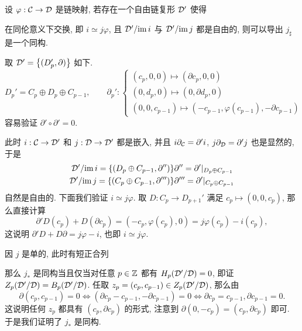 \begin{Proof}
	设 $ \varphi : \mathcal{C}\to\mathcal{D} $ 是链映射, 若存在一个自由链复形 $ \mathcal{D}' $ 使得
	\begin{center}
	\end{center}
	在同伦意义下交换, 即 $ i\simeq j\varphi $, 且 $ \mathcal{D}'/\mathrm{im}\, i $ 与 $ \mathcal{D}'/\mathrm{im}\, j $ 都是自由的, 则可以导出 $ j_\sharp $ 是一个同构.

	取 $ \mathcal{D}'=\left\{ (D_p',\partial) \right\} $ 如下.
	\[
		D_p'=C_p\oplus D_p\oplus C_{p-1},\qquad \partial_p' : \begin{cases}
			(c_p,0,0)\mapsto(\partial c_p,0,0)\\ (0,d_p,0)\mapsto(0,\partial d_p,0)\\ (0,0,c_{p-1})\mapsto(-c_{p-1},\varphi(c_{p-1}),-\partial c_{p-1})
		\end{cases}
	\]
	容易验证 $ \partial'\circ\partial'=0 $.

	此时 $ i : \mathcal{C}\to\mathcal{D}' $ 和 $ j : \mathcal{D}\to\mathcal{D}' $ 都是嵌入, 并且 $ i\partial_{\mathcal{C}}=\partial'i $, $ j\partial_{\mathcal{D}}=\partial'j $ 也是显然的, 于是
	\[
		\begin{aligned}
			\mathcal{D}'/\mathrm{im}\, i=\left\{ (D_p\oplus C_{p-1},\partial'') \right\} & \partial''=\partial'|_{D_p\oplus C_{p-1}}\\
			\mathcal{D}'/\mathrm{im}\, j=\left\{ (C_p\oplus C_{p-1},\partial''') \right\}& \partial'''=\partial'|_{C_p\oplus C_{p-1}}
		\end{aligned}
	\]
	自然是自由的. 下面我们验证 $ i\simeq j\varphi $. 取 $ D : C_p\to D_{p+1}' $ 满足 $ c_p\mapsto(0,0,c_p) $, 那么直接计算
	\[
		\partial'D(c_p)+D(\partial c_p)=(-c_p,\varphi(c_p),0)=j\varphi(c_p)-i(c_p),
	\]
	这说明 $ \partial'D+D\partial=j\varphi-i $, 也即 $ i\simeq j\varphi $.

	因 $ j $ 是单的, 此时有短正合列
	\begin{center}
	\end{center}
	那么 $ j_* $ 是同构当且仅当对任意 $ p\in\mathbb{Z} $ 都有 $ H_p(\mathcal{D}'/\mathcal{D})=0 $, 即证 $ Z_p(\mathcal{D}'/\mathcal{D})=B_p(\mathcal{D}'/\mathcal{D}) $. 任取 $ z_p=(c_p,c_{p-1})\in Z_p(\mathcal{D}'/\mathcal{D}) $, 那么由
	\[
		\partial(c_p,c_{p-1})=0\Longleftrightarrow(\partial c_p-c_{p-1},-\partial c_{p-1})=0\Longleftrightarrow \partial c_p=c_{p-1}, \partial c_{p-1}=0.
	\]
	这说明任何 $ z_p $ 都具有 $ (c_p,\partial c_p) $ 的形式, 注意到 $ \partial(0,-c_p)=(c_p,\partial c_p) $ 即可. 于是我们证明了 $ j_* $ 是同构.


\end{Proof}
